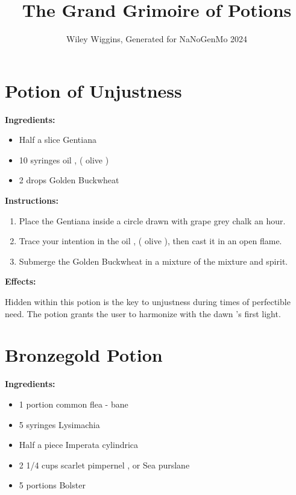 \documentclass{article}
\title{The Grand Grimoire of Potions}
\author{Wiley Wiggins, Generated for NaNoGenMo 2024}
\date{}
\begin{document}
\maketitle

\newpage
\section*{Potion of Unjustness}

\textbf{Ingredients:}

\begin{itemize}
  \item Half a slice Gentiana
  \item 10 syringes oil , ( olive )
  \item 2 drops Golden Buckwheat
\end{itemize}

\textbf{Instructions:}

\begin{enumerate}
  \item Place the Gentiana inside a circle drawn with grape grey chalk an hour.
  \item Trace your intention in the oil , ( olive ), then cast it in an open flame.
  \item Submerge the Golden Buckwheat in a mixture of the mixture and spirit.
\end{enumerate}

\textbf{Effects:}

Hidden within this potion is the key to unjustness during times of perfectible need. The potion grants the user to harmonize with the dawn 's first light.

\newpage
\section*{Bronzegold Potion}

\textbf{Ingredients:}

\begin{itemize}
  \item 1 portion common flea - bane
  \item 5 syringes Lysimachia
  \item Half a piece Imperata cylindrica
  \item 2 1/4 cups scarlet pimpernel , or Sea purslane
  \item 5 portions Bolster
\end{itemize}
\end{document}
